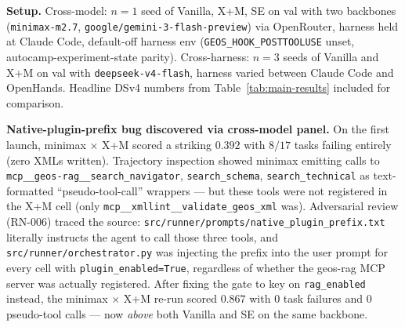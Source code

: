 \documentclass{article}
\begin{document}
\textbf{Setup.} Cross-model: $n=1$ seed of Vanilla, X+M, SE on val with two backbones (\texttt{minimax-m2.7}, \texttt{google/gemini-3-flash-preview}) via OpenRouter, harness held at Claude Code, default-off harness env (\texttt{GEOS\_HOOK\_POSTTOOLUSE} unset, autocamp-experiment-state parity). Cross-harness: $n=3$ seeds of Vanilla and X+M on val with \texttt{deepseek-v4-flash}, harness varied between Claude Code and OpenHands. Headline DSv4 numbers from Table~\ref{tab:main-results} included for comparison.

\begin{table}[h]
  \caption{Full cross-model and cross-harness panel. Counts in parentheses are task failures out of 17. The minimax × X+M result of $0.392$ in italic is the pre-fix number reported in the project log; the corrected number ($0.867$) replaces it after the prefix-gate bug fix described below.}
  \label{tab:cross-cutting-full}
  \centering
  \small
\end{table}

\textbf{Native-plugin-prefix bug discovered via cross-model panel.} On the first launch, minimax × X+M scored a striking $0.392$ with $8/17$ tasks failing entirely (zero XMLs written). Trajectory inspection showed minimax emitting calls to \texttt{mcp\_\_geos-rag\_\_search\_navigator}, \texttt{search\_schema}, \texttt{search\_technical} as text-formatted ``pseudo-tool-call'' wrappers --- but these tools were not registered in the X+M cell (only \texttt{mcp\_\_xmllint\_\_validate\_geos\_xml} was). Adversarial review (RN-006) traced the source: \texttt{src/runner/prompts/native\_plugin\_prefix.txt} literally instructs the agent to call those three tools, and \texttt{src/runner/orchestrator.py} was injecting the prefix into the user prompt for every cell with \texttt{plugin\_enabled=True}, regardless of whether the geos-rag MCP server was actually registered. After fixing the gate to key on \texttt{rag\_enabled} instead, the minimax × X+M re-run scored $0.867$ with $0$ task failures and $0$ pseudo-tool calls --- now \emph{above} both Vanilla and SE on the same backbone.
\end{document}
